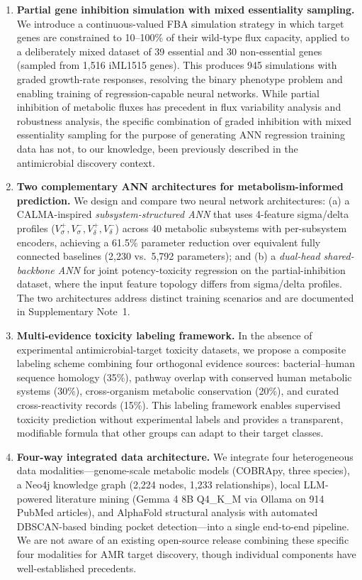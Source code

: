 \documentclass[12pt,a4paper]{article}
\begin{document}
\begin{enumerate}
    \item \textbf{Partial gene inhibition simulation with mixed essentiality sampling.} We introduce a continuous-valued FBA simulation strategy in which target genes are constrained to 10--100\% of their wild-type flux capacity, applied to a deliberately mixed dataset of 39 essential and 30 non-essential genes (sampled from 1,516 iML1515 genes). This produces 945 simulations with graded growth-rate responses, resolving the binary phenotype problem and enabling training of regression-capable neural networks. While partial inhibition of metabolic fluxes has precedent in flux variability analysis and robustness analysis, the specific combination of graded inhibition with mixed essentiality sampling for the purpose of generating ANN regression training data has not, to our knowledge, been previously described in the antimicrobial discovery context.

    \item \textbf{Two complementary ANN architectures for metabolism-informed prediction.} We design and compare two neural network architectures: (a) a CALMA-inspired \textit{subsystem-structured ANN} that uses 4-feature sigma/delta profiles ($V^+_\sigma, V^-_\sigma, V^+_\delta, V^-_\delta$) across 40 metabolic subsystems with per-subsystem encoders, achieving a 61.5\% parameter reduction over equivalent fully connected baselines (2,230 vs.\ 5,792 parameters); and (b) a \textit{dual-head shared-backbone ANN} for joint potency-toxicity regression on the partial-inhibition dataset, where the input feature topology differs from sigma/delta profiles. The two architectures address distinct training scenarios and are documented in Supplementary Note~1.

    \item \textbf{Multi-evidence toxicity labeling framework.} In the absence of experimental antimicrobial-target toxicity datasets, we propose a composite labeling scheme combining four orthogonal evidence sources: bacterial--human sequence homology (35\%), pathway overlap with conserved human metabolic systems (30\%), cross-organism metabolic conservation (20\%), and curated cross-reactivity records (15\%). This labeling framework enables supervised toxicity prediction without experimental labels and provides a transparent, modifiable formula that other groups can adapt to their target classes.

    \item \textbf{Four-way integrated data architecture.} We integrate four heterogeneous data modalities---genome-scale metabolic models (COBRApy, three species), a Neo4j knowledge graph (2,224 nodes, 1,233 relationships), local LLM-powered literature mining (Gemma 4 8B Q4\_K\_M via Ollama on 914 PubMed articles), and AlphaFold structural analysis with automated DBSCAN-based binding pocket detection---into a single end-to-end pipeline. We are not aware of an existing open-source release combining these specific four modalities for AMR target discovery, though individual components have well-established precedents.


\end{enumerate}
\end{document}
